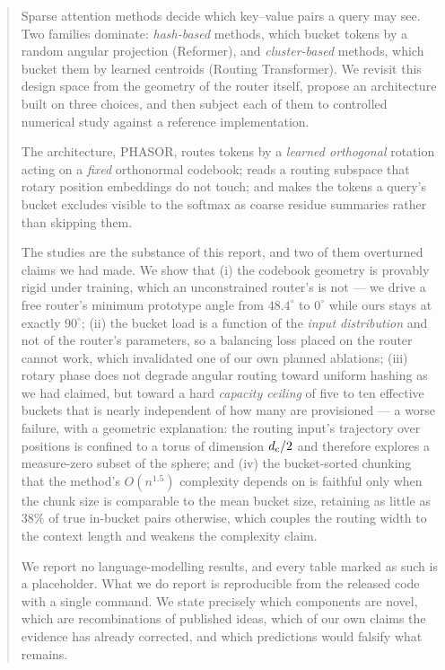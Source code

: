 \begin{abstract}
\noindent
Sparse attention methods decide which key--value pairs a query may see. Two families dominate: \emph{hash-based} methods, which bucket tokens by a random angular projection (Reformer), and \emph{cluster-based} methods, which bucket them by learned centroids (Routing Transformer). We revisit this design space from the geometry of the router itself, propose an architecture built on three choices, and then subject each of them to controlled numerical study against a reference implementation.

The architecture, PHASOR, routes tokens by a \emph{learned orthogonal} rotation acting on a \emph{fixed} orthonormal codebook; reads a routing subspace that rotary position embeddings do not touch; and makes the tokens a query's bucket excludes visible to the softmax as coarse residue summaries rather than skipping them.

The studies are the substance of this report, and two of them overturned claims we had made. We show that (i) the codebook geometry is provably rigid under training, which an unconstrained router's is not --- we drive a free router's minimum prototype angle from $48.4^\circ$ to $0^\circ$ while ours stays at exactly $90^\circ$; (ii) the bucket load is a function of the \emph{input distribution} and not of the router's parameters, so a balancing loss placed on the router cannot work, which invalidated one of our own planned ablations; (iii) rotary phase does not degrade angular routing toward uniform hashing as we had claimed, but toward a hard \emph{capacity ceiling} of five to ten effective buckets that is nearly independent of how many are provisioned --- a worse failure, with a geometric explanation: the routing input's trajectory over positions is confined to a torus of dimension $\dc/2$ and therefore explores a measure-zero subset of the sphere; and (iv) the bucket-sorted chunking that the method's $O(n^{1.5})$ complexity depends on is faithful only when the chunk size is comparable to the mean bucket size, retaining as little as $38\%$ of true in-bucket pairs otherwise, which couples the routing width to the context length and weakens the complexity claim.

We report no language-modelling results, and every table marked as such is a placeholder. What we do report is reproducible from the released code with a single command. We state precisely which components are novel, which are recombinations of published ideas, which of our own claims the evidence has already corrected, and which predictions would falsify what remains.
\end{abstract}

